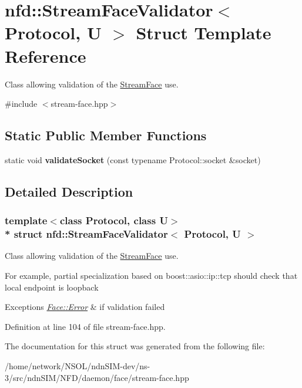 \hypertarget{structnfd_1_1StreamFaceValidator}{}\section{nfd\+:\+:Stream\+Face\+Validator$<$ Protocol, U $>$ Struct Template Reference}
\label{structnfd_1_1StreamFaceValidator}


Class allowing validation of the \hyperlink{classnfd_1_1StreamFace}{Stream\+Face} use.  




{\ttfamily \#include $<$stream-\/face.\+hpp$>$}

\subsection*{Static Public Member Functions}
\begin{DoxyCompactItemize}
\item 
static void {\bfseries validate\+Socket} (const typename Protocol\+::socket \&socket)\hypertarget{structnfd_1_1StreamFaceValidator_a551bbad7f1bb2b617a1cf46de0aacdcc}{}\label{structnfd_1_1StreamFaceValidator_a551bbad7f1bb2b617a1cf46de0aacdcc}

\end{DoxyCompactItemize}


\subsection{Detailed Description}
\subsubsection*{template$<$class Protocol, class U$>$\\*
struct nfd\+::\+Stream\+Face\+Validator$<$ Protocol, U $>$}

Class allowing validation of the \hyperlink{classnfd_1_1StreamFace}{Stream\+Face} use. 

For example, partial specialization based on boost\+::asio\+::ip\+::tcp should check that local endpoint is loopback


\begin{DoxyExceptions}{Exceptions}
{\em \hyperlink{classnfd_1_1Face_1_1Error}{Face\+::\+Error}} & if validation failed \\
\hline
\end{DoxyExceptions}


Definition at line 104 of file stream-\/face.\+hpp.



The documentation for this struct was generated from the following file\+:\begin{DoxyCompactItemize}
\item 
/home/network/\+N\+S\+O\+L/ndn\+S\+I\+M-\/dev/ns-\/3/src/ndn\+S\+I\+M/\+N\+F\+D/daemon/face/stream-\/face.\+hpp\end{DoxyCompactItemize}
